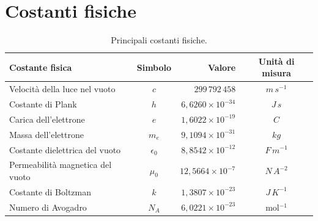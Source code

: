 \documentclass[a4paper,12pt,titlepage,openany]{book}
\theoremstyle{mydef}
\begin{document}
    
    \chapter{Costanti fisiche}
        \begin{table}[h]
            \caption{Principali costanti fisiche.}
            \centering
            \begin{tabular}{lcrc}
                \toprule
                Costante fisica & Simbolo & Valore & Unità di misura\\
                \midrule
                Velocità della luce nel vuoto & $c$ & $299\,792\,458$ & $m\,s^{-1}$\\
                Costante di Plank & $h$ & $6,6260\times 10^{-34}$ & $J\,s$\\
                Carica dell'elettrone & $e$ & $1,6022\times 10^{-19}$ & $C$\\
                Massa dell'elettrone & $m_e$ & $9,1094\times 10^{-31}$ & $kg$\\
                Costante dielettrica del vuoto & $\epsilon_0$ & $8,8542\times 10^{-12}$ & $F\,m^{-1}$\\
                Permeabilità magnetica del vuoto & $\mu_0$ & $12,5664\times 10^{-7}$ & $N\,A^{-2}$\\
                Costante di Boltzman & $k$ & $1,3807\times 10^{-23}$ & $J\,K^{-1}$\\
                Numero di Avogadro & $N_A$ & $6,0221\times 10^{-23}$ & mol$^{-1}$\\
                \bottomrule
            \end{tabular}
        \end{table}
    
\end{document}
